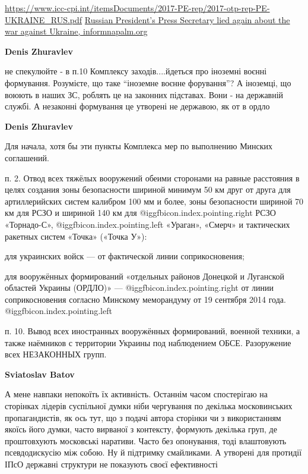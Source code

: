 \begin{itemize}
\begin{itemize}
\url{https://www.icc-cpi.int/itemsDocuments/2017-PE-rep/2017-otp-rep-PE-UKRAINE_RUS.pdf}
\href{https://informnapalm.org/en/russian-presidents-press-secretary-lied-again-about-the-war-against-ukraine}{%
Russian President’s Press Secretary lied again about the war against Ukraine, %
informnapalm.org%
}

\textbf{Denis Zhuravlev} 

не спекулюйте - в п.10 Комплексу заходів....йдеться про іноземні воєнні
формування. Розумієте, що таке \enquote{іноземне воєнне форування}? А іноземці, що
воюють в наших ЗС, роблять це на законних підставах. Вони - на державній
службі. А незаконні формування це утворені не державою, як от в ордло

\textbf{Denis Zhuravlev} 

Для начала, хотя бы эти пункты Комплекса мер по выполнению Минских соглашений.

п. 2. Отвод всех тяжёлых вооружений обеими сторонами на равные расстояния в
целях создания зоны безопасности шириной минимум 50 км друг от друга для
артиллерийских систем калибром 100 мм и более, зоны безопасности шириной 70 км
для РСЗО и шириной 140 км для  @igg{fbicon.index.pointing.right} РСЗО
«Торнадо-С», @igg{fbicon.index.pointing.left}  «Ураган», «Смерч» и тактических
ракетных систем «Точка» («Точка У»):

для украинских войск — от фактической линии соприкосновения;

для вооружённых формирований «отдельных районов Донецкой и Луганской областей
Украины (ОРДЛО)» —  @igg{fbicon.index.pointing.right} от линии соприкосновения
согласно Минскому меморандуму от 19 сентября 2014 года.
@igg{fbicon.index.pointing.left} 

п. 10. Вывод всех иностранных вооружённых формирований, военной техники, а
также наёмников с территории Украины под наблюдением ОБСЕ. Разоружение всех
НЕЗАКОННЫХ групп.

\textbf{Sviatoslav Batov} 

А мене навпаки непокоїть їх активність. Останнім часом спостерігаю на сторінках
лідерів суспільної думки ніби чергування по декілька московинських
пропагандистів, як ось тут, що з подачі автора сторінки чи з використанням
якоїсь його думки, часто вирваної з контексту, формують декілька груп, де
проштовхують московські наративи. Часто без опонування, тоді влаштовують
псевдодискусію між собою. Ну й підтримку смайликами. А утворені для протидії
ІПсО державні структури не показують своєї ефективності


\end{itemize}
\end{itemize}
